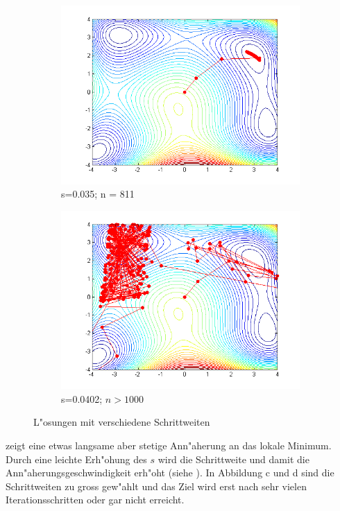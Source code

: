\begin{figure}[h]
\begin{subfigure}[b]{0.49\textwidth}
\centering
\includegraphics[width=\textwidth]{descent/HB_3.png}
\caption{s=0.035; n = 811}
\end{subfigure} \begin{subfigure}[b]{0.49\textwidth}
\centering
\includegraphics[width=\textwidth]{descent/HB_4.png}
\caption{s=0.0402; $n > 1000$}
\end{subfigure}
\caption{L"osungen mit verschiedene Schrittweiten}
\label{schrittweite}
\end{figure}

 zeigt eine etwas langsame aber stetige Ann"aherung
an das lokale Minimum. Durch eine leichte Erh"ohung des $s$ wird die
Schrittweite und damit die Ann"aherungsgeschwindigkeit erh"oht (siehe
 ).
In Abbildung c und d sind die Schrittweiten zu gross gew"ahlt und das Ziel
wird erst nach sehr vielen Iterationsschritten oder gar nicht erreicht.

